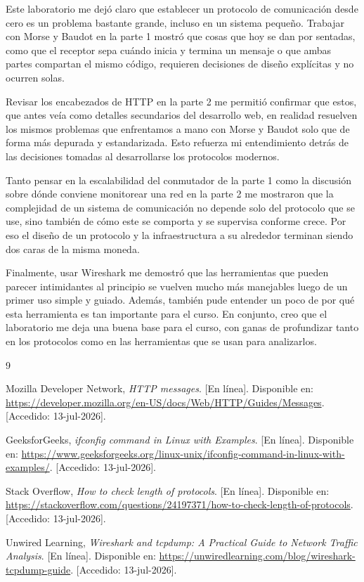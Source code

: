 \documentclass[11pt]{article}
\begin{document}
Este laboratorio me dejó claro que establecer un protocolo de comunicación desde cero es un problema bastante grande, incluso en
un sistema pequeño. Trabajar con Morse y Baudot en la parte 1 mostró que cosas que hoy se dan por sentadas, como que el receptor
sepa cuándo inicia y termina un mensaje o que ambas partes compartan el mismo código, requieren decisiones de diseño explícitas
y no ocurren solas.

Revisar los encabezados de HTTP en la parte 2 me permitió confirmar que estos, que antes veía como detalles secundarios del
desarrollo web, en realidad resuelven los mismos problemas que enfrentamos a mano con Morse y Baudot solo que de forma más
depurada y estandarizada. Esto refuerza mi entendimiento detrás de las decisiones tomadas al desarrollarse los protocolos
modernos.

Tanto pensar en la escalabilidad del conmutador de la parte 1 como la discusión sobre dónde conviene monitorear una red en la
parte 2 me mostraron que la complejidad de un sistema de comunicación no depende solo del protocolo que se use, sino también de
cómo este se comporta y se supervisa conforme crece. Por eso el diseño de un protocolo y la infraestructura a su alrededor
terminan siendo dos caras de la misma moneda.

Finalmente, usar Wireshark me demostró que las herramientas que pueden parecer intimidantes al principio se vuelven mucho más manejables
luego de un primer uso simple y guiado. Además, también pude entender un poco de por qué esta herramienta es tan importante para el curso. En
conjunto, creo que el laboratorio me deja una buena base para el curso, con ganas de profundizar tanto en los protocolos como en las herramientas
que se usan para analizarlos.

\newpage

\begin{thebibliography}{9}

Mozilla Developer Network, \textit{HTTP messages}. [En línea]. Disponible en:
\url{https://developer.mozilla.org/en-US/docs/Web/HTTP/Guides/Messages}. [Accedido: 13-jul-2026].

GeeksforGeeks, \textit{ifconfig command in Linux with Examples}. [En línea]. Disponible en:
\url{https://www.geeksforgeeks.org/linux-unix/ifconfig-command-in-linux-with-examples/}. [Accedido: 13-jul-2026].

Stack Overflow, \textit{How to check length of protocols}. [En línea]. Disponible en:
\url{https://stackoverflow.com/questions/24197371/how-to-check-length-of-protocols}. [Accedido: 13-jul-2026].

Unwired Learning, \textit{Wireshark and tcpdump: A Practical Guide to Network Traffic Analysis}. [En línea]. Disponible en:
\url{https://unwiredlearning.com/blog/wireshark-tcpdump-guide}. [Accedido: 13-jul-2026].

\end{thebibliography}
\end{document}
